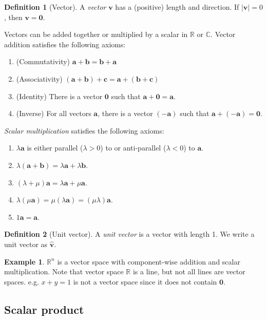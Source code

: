 \documentclass[a4paper]{article}
\theoremstyle{definition}
\newtheorem*{defi}{Definition}
\newtheorem*{eg}{Example}
\newcommand{\mb}[1]{\mathbf{#1}}
\newcommand{\R}{\mathbb{R}}
\newcommand{\C}{\mathbb{C}}
\begin{document}
\begin{defi}[Vector]
  A \emph{vector} $\mb{v}$ has a (positive) length and direction.  If $|\mb{v}| = 0$, then $\mb{v} = \mb{0}$.

  Vectors can be added together or multiplied by a scalar in $\R$ or $\C$. Vector addition satisfies the following axioms:
  \begin{enumerate}
  \item (Commutativity) $\mb{a} + \mb{b} = \mb{b} + \mb{a}$
  \item (Associativity) $(\mb{a} + \mb{b}) + \mb{c} = \mb{a} + (\mb{b} + \mb{c})$
  \item (Identity) There is a vector $\mb{0}$ such that $\mb{a} + \mb{0} = \mb{a}$.
  \item (Inverse) For all vectors $\mb{a}$, there is a vector $(-\mb{a})$ such that $\mb{a} + (-\mb{a}) = \mb{0}$.
  \end{enumerate}
  \emph{Scalar multiplication} satisfies the following axioms:
  \begin{enumerate}
  \item $\lambda\mb{a}$ is either parallel ($\lambda > 0$) to or anti-parallel ($\lambda < 0$) to $\mb{a}$.
  \item $\lambda(\mb{a + b}) = \lambda\mb{a} + \lambda\mb{b}$.
  \item $(\lambda + \mu)\mb{a} = \lambda\mb{a} + \mu\mb{a}$.
  \item $\lambda(\mu\mb{a}) = \mu(\lambda\mb{a}) = (\mu\lambda)\mb{a}$.
  \item $1\mb{a = a}$.
  \end{enumerate}
\end{defi}

\begin{defi}[Unit vector]
  A \emph{unit vector} is a vector with length 1. We write a unit vector as $\hat{\mb{v}}$.
\end{defi}

\begin{eg}
  $\R^n$ is a vector space with component-wise addition and scalar multiplication. Note that vector space $\R$ is a line, but not all lines are vector spaces. e.g. $x + y = 1$ is not a vector space since it does not contain $\mb{0}$.
\end{eg}

\subsection{Scalar product}
\end{document}
